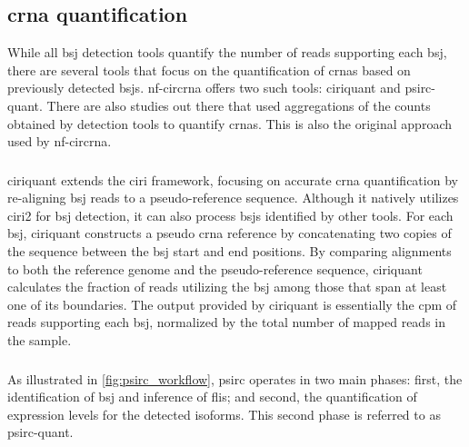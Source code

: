 \subsection{\gls{crna} quantification}
\label{sec:crna_quantification}

While all \gls{bsj} detection tools quantify the number of reads supporting
each \gls{bsj}, there are several tools that focus on the quantification of
\glspl{crna} based on previously detected \glspl{bsj}.
\gls{nf-circrna} offers two such tools: \gls{ciriquant} and
psirc-quant.
There are also studies out there that used aggregations of the counts obtained
by detection tools to quantify \glspl{crna}\supercite{gaffo_sensitive_2022}.
This is also the original approach used by
\gls{nf-circrna}\supercite{digby_nf-corecircrna_2023}.

\subsubsection{}
\label{sec:ciriquant}
\gls{ciriquant} extends the \gls{ciri} framework, focusing on accurate
\gls{crna} quantification by
re-aligning \gls{bsj} reads to a pseudo-reference sequence.
Although it natively utilizes \gls{ciri2} for \gls{bsj} detection, it can also
process \glspl{bsj} identified by other tools\supercite{zhang_accurate_2020}.
For each \gls{bsj}, \gls{ciriquant} constructs a pseudo \gls{crna} reference by
concatenating two copies of the sequence between the \gls{bsj} start and end
positions.
By comparing alignments to both the reference genome and the pseudo-reference
sequence, \gls{ciriquant} calculates the fraction of reads utilizing the
\gls{bsj} among those that span at least one of its
boundaries\supercite{zhang_accurate_2020}.
The output provided by \gls{ciriquant} is essentially the \gls{cpm} of reads
supporting each \gls{bsj}, normalized by the total number of mapped reads in
the sample.

\subsubsection{}
\label{sec:psirc}
As illustrated in \cref{fig:psirc_workflow}, \gls{psirc} operates in two main
phases: first, the identification of \gls{bsj} and inference of \glspl{fli};
and second, the quantification of expression levels for the detected
isoforms\supercite{yu_quantifying_2021}.
This second phase is referred to as \gls{psirc-quant}.

